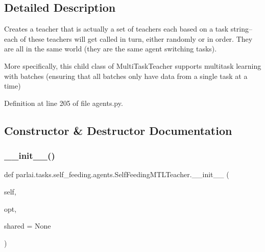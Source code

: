 \subsection{Detailed Description}
\begin{DoxyVerb}Creates a teacher that is actually a set of teachers each based on a task string--
each of these teachers will get called in turn, either randomly or in order. They
are all in the same world (they are the same agent switching tasks).

More specifically, this child class of MultiTaskTeacher supports multitask learning
with batches (ensuring that all batches only have data from a single task at a time)
\end{DoxyVerb}
 

Definition at line 205 of file agents.\+py.



\subsection{Constructor \& Destructor Documentation}
\mbox{\label{classparlai_1_1tasks_1_1self__feeding_1_1agents_1_1SelfFeedingMTLTeacher_a422eb4bb783b661fb071405964faa27b}} 
\subsubsection{\texorpdfstring{\+\_\+\+\_\+init\+\_\+\+\_\+()}{\_\_init\_\_()}}
{\footnotesize\ttfamily def parlai.\+tasks.\+self\+\_\+feeding.\+agents.\+Self\+Feeding\+M\+T\+L\+Teacher.\+\_\+\+\_\+init\+\_\+\+\_\+ (\begin{DoxyParamCaption}\item[{}]{self,  }\item[{}]{opt,  }\item[{}]{shared = {\ttfamily None} }\end{DoxyParamCaption})}



